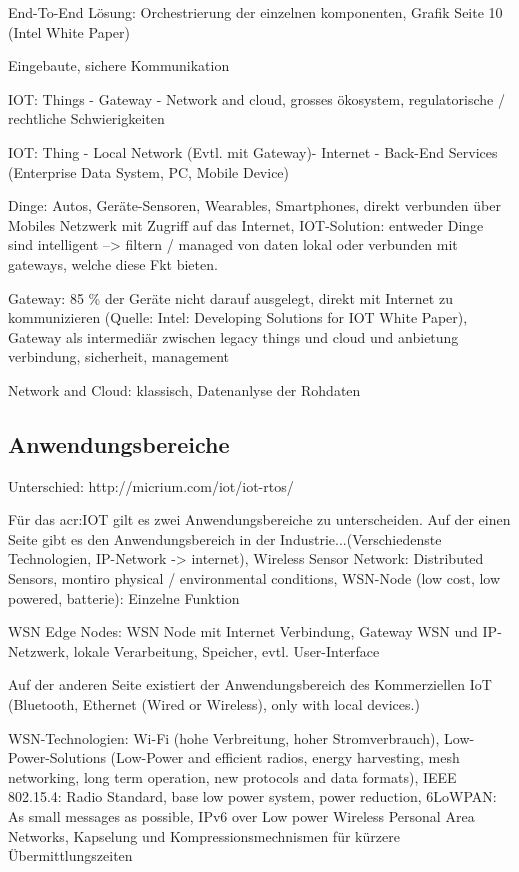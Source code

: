 End-To-End Lösung: Orchestrierung der einzelnen komponenten,  Grafik Seite 10 (Intel White Paper)

Eingebaute, sichere Kommunikation

IOT: Things - Gateway - Network and cloud, grosses ökosystem, regulatorische / rechtliche Schwierigkeiten 

IOT: Thing - Local Network  (Evtl. mit Gateway)- Internet - Back-End Services (Enterprise Data System, PC, Mobile Device)

Dinge: Autos, Geräte-Sensoren, Wearables, Smartphones,  direkt verbunden über Mobiles Netzwerk mit Zugriff auf das Internet, IOT-Solution: entweder Dinge sind intelligent --> filtern / managed von daten lokal oder verbunden mit gateways, welche diese Fkt bieten.

Gateway: 85 \% der Geräte nicht darauf ausgelegt, direkt mit Internet zu kommunizieren (Quelle: Intel: Developing Solutions for IOT White Paper), Gateway als intermediär zwischen legacy things und cloud und anbietung verbindung, sicherheit, management

Network and Cloud: klassisch, Datenanlyse der Rohdaten


\subsection{Anwendungsbereiche}
Unterschied: http://micrium.com/iot/iot-rtos/

Für das \gls{acr:IOT} gilt es zwei Anwendungsbereiche zu unterscheiden. Auf der einen Seite gibt es den Anwendungsbereich in der Industrie...(Verschiedenste Technologien, IP-Network -> internet), Wireless Sensor Network: Distributed Sensors, montiro physical / environmental conditions, WSN-Node (low cost, low powered, batterie): Einzelne Funktion

WSN Edge Nodes: WSN Node mit Internet Verbindung, Gateway WSN und IP-Netzwerk, lokale Verarbeitung, Speicher, evtl. User-Interface

Auf der anderen Seite existiert der Anwendungsbereich des Kommerziellen IoT (Bluetooth, Ethernet (Wired or Wireless), only with local devices.)


WSN-Technologien: Wi-Fi (hohe Verbreitung, hoher Stromverbrauch), Low-Power-Solutions (Low-Power and efficient radios, energy harvesting, mesh networking, long term operation, new protocols and data formats), IEEE 802.15.4: Radio Standard, base low power system, power reduction, 6LoWPAN: As small messages as possible, IPv6 over Low power Wireless Personal Area Networks, Kapselung und Kompressionsmechnismen für kürzere Übermittlungszeiten


